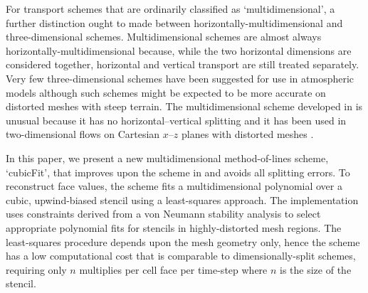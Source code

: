 For transport schemes that are ordinarily classified as `multidimensional', a further distinction ought to made between horizontally-multidimensional and three-dimensional schemes.
Multidimensional schemes are almost always horizontally-multidimensional because, while the two horizontal dimensions are considered together, horizontal and vertical transport are still treated separately.
Very few three-dimensional schemes have been suggested for use in atmospheric models \citep[e.g.][]{miura2007,yeh2007,gassmann2013} although such schemes might be expected to be more accurate on distorted meshes with steep terrain.
The multidimensional scheme developed in \citep{weller-shahrokhi2014} is unusual because it has no horizontal--vertical splitting and it has been used in two-dimensional flows on Cartesian $x$--$z$ planes with distorted meshes \citep{shaw-weller2016,weller2017}.

In this paper, we present a new multidimensional method-of-lines scheme, `cubicFit', that improves upon the scheme in \citep{weller-shahrokhi2014} and avoids all splitting errors.  To reconstruct face values, the scheme fits a multidimensional polynomial over a cubic, upwind-biased stencil using a least-squares approach.  The implementation uses constraints derived from a von Neumann stability analysis to select appropriate polynomial fits for stencils in highly-distorted mesh regions.  The least-squares procedure depends upon the mesh geometry only, hence the scheme has a low computational cost that is comparable to dimensionally-split schemes, requiring only $n$ multiplies per cell face per time-step where $n$ is the size of the stencil.






